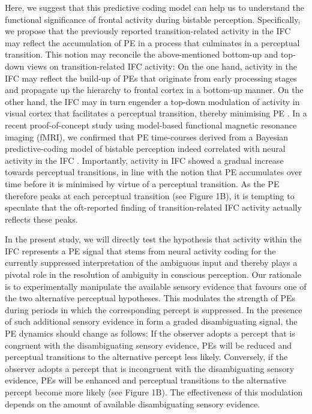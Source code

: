 \documentclass[12pt]{article}
\begin{document}
Here, we suggest that this predictive coding model can help us to understand the functional significance of frontal activity during bistable perception. Specifically, we propose that the previously reported transition-related activity in the IFC \parencite{Brascamp2018} may reflect the accumulation of PE in a process that culminates in a perceptual transition. This notion may reconcile the above-mentioned bottom-up and top-down views on transition-related IFC activity: On the one hand, activity in the IFC may reflect the build-up of PEs that originate from early processing stages and propagate up the hierarchy to frontal cortex in a bottom-up manner. On the other hand, the IFC may in turn engender a top-down modulation of activity in visual cortex that facilitates a perceptual transition, thereby minimising PE \parencite{Weilnhammer2013, Brascamp2018}. In a recent proof-of-concept study using model-based functional magnetic resonance imaging (fMRI), we confirmed that PE time-courses derived from a Bayesian predictive-coding model of bistable perception indeed correlated with neural activity in the IFC \parencite{Weilnhammer2017}. Importantly, activity in IFC showed a gradual increase towards perceptual transitions, in line with the notion that PE accumulates over time before it is minimised by virtue of a perceptual transition. As the PE therefore peaks at each perceptual transition (see Figure 1B), it is tempting to speculate that the oft-reported finding of transition-related IFC activity \parencite{Brascamp2018} actually reflects these peaks.  

In the present study, we will directly test the hypothesis that activity within the IFC represents a PE signal that stems from neural activity coding for the currently suppressed interpretation of the ambiguous input and thereby plays a pivotal role in the resolution of ambiguity in conscious perception. Our rationale is to experimentally manipulate the available sensory evidence that favours one of the two alternative perceptual hypotheses. This modulates the strength of PEs during periods in which the corresponding percept is suppressed. In the presence of such additional sensory evidence in form a graded disambiguating signal, the PE dynamics should change as follows: If the observer adopts a percept that is congruent with the disambiguating sensory evidence, PEs will be reduced and perceptual transitions to the alternative percept less likely. Conversely, if the observer adopts a percept that is incongruent with the disambiguating sensory evidence, PEs will be enhanced and perceptual transitions to the alternative percept become more likely (see Figure 1B). The effectiveness of this modulation depends on the amount of available disambiguating sensory evidence. 
\end{document}
